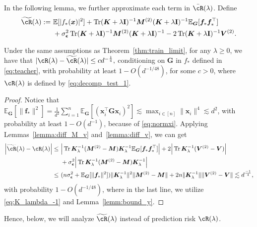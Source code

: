 \documentclass[twoside,11pt]{article}
\newcommand{\bepsilon}{\boldsymbol{\epsilon}}
\newcommand{\E}{\mathbb{E}}
\def\bI{{\mathbf I}}
\def\bG{{\boldsymbol G}}
\def\vf{{\boldsymbol f}}
\def\bK{{\boldsymbol K}}
\def\bV{{\boldsymbol V}}
\def\bM{{\boldsymbol M}}
\def\bx{{\boldsymbol x}}
\renewcommand{\bK}{\boldsymbol{K}}
\newcommand{\Tr}{\operatorname{Tr}}
\newcommand{\1}{\mathbf{1}}
\begin{document}
In the following lemma, we further approximate each term in $\bar\cR(\lambda)$. Define 
\begin{align}
    \widetilde\cR(\lambda):=~& \E [|f_*(\bx)|^2]+ \Tr(\bK+\lambda\bI)^{-1} \bM^{(2)} (\bK+\lambda\bI)^{-1}\E_{\bG}[\vf_*\vf_*^\top]\nonumber\\
    ~&+\sigma^2_{\bepsilon}\Tr(\bK+\lambda\bI)^{-1}\bM^{(2)}(\bK +\lambda\bI)^{-1}  
     -2\Tr (\bK+\lambda\bI)^{-1}\bV^{(2)}. \label{eq:decomp_test_2}
\end{align}

\begin{lemma}\label{lemma:diff_R_Rtilde}
 Under the same assumptions as Theorem~\ref{thm:train_limit}, for any $\lambda\ge 0$, we have that
$
    |\cR(\lambda)-\widetilde\cR(\lambda)|\le  c d^{{-}\frac{1}{4}} ,
$
conditioning on $\bG$ in $f_*$ defined in \eqref{eq:teacher}, with probability at least $1-O(d^{-1/48})$, for some $c>0$,  where $\cR(\lambda)$ is defined by \eqref{eq:decomp_test_1}.
\end{lemma}
\begin{proof}
Notice that
$
    \E_{\bG}[\|\vf_*\|^2]=\frac{1}{d^2}\sum_{i=1}^n \E_{\bG}[(\bx_i^\top\bG\bx_i)^2]\lesssim \max_{i\in[n]}\|\bx_i\|^4\lesssim  
    d^2$, with probability at least $1-O(d^{-1})$,
because of \eqref{eq:normxi}.
Applying Lemmas~\ref{lemma:diff_M_v} and~\ref{lemma:diff_v}, we can get
\begin{align}
    \Big|\widetilde\cR(\lambda)-\cR(\lambda)\Big|\le~& \Big|\Tr\bK_{\lambda}^{-1}(\bM^{(2)}-\bM)\bK_{\lambda}^{-1} \E_{\bG}[\vf_*\vf_*^\top ] \Big|
    +2\Big|\Tr\bK_{\lambda}^{-1}(\bV^{(2)}-\bV)\Big|\\
    ~& +\sigma^2_{\bepsilon}\Big|\Tr\bK_{\lambda}^{-1}(\bM^{(2)}-\bM)\bK_{\lambda}^{-1}\Big|\\
    \le ~&  (n\sigma^2_{\bepsilon}+\E_{\bG}[\|\vf_*\|^2])\|\bK_{\lambda}^{-1}\|^2 \|\bM^{(2)}-\bM\|+2n\|\bK_{\lambda}^{-1}\|  \|\bV^{(2)}-\bV\|  
    \lesssim  d^{\frac{-1}{4}},
\end{align}
with probability  $1-O(d^{-1/48})$, where in the last line, we utilize \eqref{eq:K_lambda_-1} and Lemma~\ref{lemm:bound_y}.
\end{proof}
Hence, below, we will analyze $\widetilde\cR(\lambda)$ instead of prediction risk $\cR(\lambda)$.

 
\end{document}
